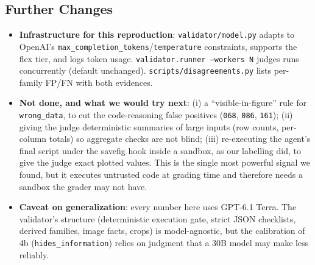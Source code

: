 \documentclass[11pt]{article}
\newcommand{\run}[1]{\texttt{#1}}
\begin{document}
\subsection{Further Changes}
\begin{itemize}
\item \textbf{Infrastructure for this reproduction}: \texttt{validator/model.py}
adapts to OpenAI's \texttt{max\_completion\_tokens}/\texttt{temperature}
constraints, supports the flex tier, and logs token usage.
\texttt{validator.runner --workers N} judges runs concurrently (default
unchanged). \texttt{scripts/disagreements.py} lists per-family FP/FN with both
evidences.
\item \textbf{Not done, and what we would try next}: (i) a ``visible-in-figure''
rule for \texttt{wrong\_data}, to cut the code-reasoning false positives
(\run{068}, \run{086}, \run{161}); (ii) giving the judge deterministic summaries
of large inputs (row counts, per-column totals) so aggregate checks are not
blind; (iii) re-executing the agent's final script under the savefig hook
inside a sandbox, as our labelling did, to give the judge exact plotted values.
This is the single most powerful signal we found, but it executes untrusted
code at grading time and therefore needs a sandbox the grader may not have.
\item \textbf{Caveat on generalization}: every number here uses GPT-6.1 Terra.
The validator's structure (deterministic execution gate, strict JSON
checklists, derived families, image facts, crops) is model-agnostic, but the
calibration of 4b (\texttt{hides\_information}) relies on judgment that a 30B
model may make less reliably.
\end{itemize}
\end{document}
